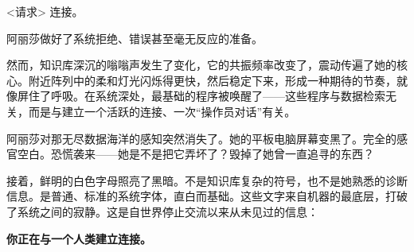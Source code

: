 {\sffamily <请求> 连接。}

阿丽莎做好了系统拒绝、错误甚至毫无反应的准备。

然而，知识库深沉的嗡嗡声发生了变化，它的共振频率改变了，震动传遍了她的核心。附近阵列中的柔和灯光闪烁得更快，然后稳定下来，形成一种期待的节奏，就像屏住了呼吸。在系统深处，最基础的程序被唤醒了——这些程序与数据检索无关，而是与建立一个活跃的连接、一次“操作员对话”有关。

阿丽莎对那无尽数据海洋的感知突然消失了。她的平板电脑屏幕变黑了。完全的感官空白。恐慌袭来——她是不是把它弄坏了？毁掉了她曾一直追寻的东西？

接着，鲜明的白色字母照亮了黑暗。不是知识库复杂的符号，也不是她熟悉的诊断信息。是普通、标准的系统字体，直白而基础。这些文字来自机器的最底层，打破了系统之间的寂静。这是自世界停止交流以来从未见过的信息：

{\sffamily\bfseries 你正在与一个人类建立连接。}
